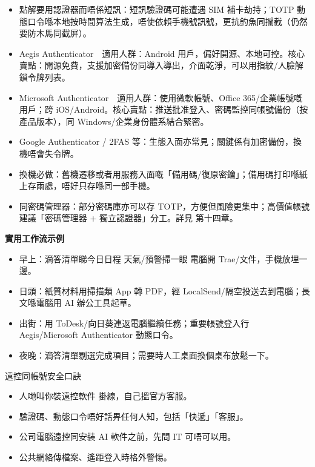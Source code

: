 
\begin{itemize}
  \item 點解要用認證器而唔係短訊：短訊驗證碼可能遭遇 SIM 補卡劫持；TOTP 動態口令喺本地按時間算法生成，唔使依賴手機號訊號，更抗釣魚同攔截（仍然要防木馬同截屏）。
  \item Aegis Authenticator　適用人群：Android 用戶，偏好開源、本地可控。核心賣點：開源免費，支援加密備份同導入導出，介面乾淨，可以用指紋/人臉解鎖令牌列表。
  \item Microsoft Authenticator　適用人群：使用微軟帳號、Office 365/企業帳號嘅用戶；跨 iOS/Android。核心賣點：推送批准登入、密碼監控同帳號備份（按產品版本），同 Windows/企業身份體系結合緊密。
  \item Google Authenticator / 2FAS 等：生態入面亦常見；關鍵係有加密備份，換機唔會失令牌。
  \item 換機必做：舊機遷移或者用服務入面嘅「備用碼/復原密鑰」；備用碼打印喺紙上存兩處，唔好只存喺同一部手機。
  \item 同密碼管理器：部分密碼庫亦可以存 TOTP，方便但風險更集中；高價值帳號建議「密碼管理器 + 獨立認證器」分工。詳見 第十四章。
\end{itemize}


\textbf{實用工作流示例}\par

\begin{itemize}
  \item 早上：滴答清單睇今日日程 天氣/預警掃一眼 電腦開 Trae/文件，手機放埋一邊。
  \item 日頭：紙質材料用掃描類 App 轉 PDF，經 LocalSend/隔空投送去到電腦；長文喺電腦用 AI 辦公工具起草。
  \item 出街：用 ToDesk/向日葵連返電腦繼續任務；重要帳號登入行 Aegis/Microsoft Authenticator 動態口令。
  \item 夜晚：滴答清單剔選完成項目；需要時人工桌面換個桌布放鬆一下。
\end{itemize}

\begin{tcbwarn}{遠控同帳號安全口訣}
\begin{itemize}
  \item 人哋叫你裝遠控軟件 掛線，自己搵官方客服。
  \item 驗證碼、動態口令唔好話畀任何人知，包括「快遞」「客服」。
  \item 公司電腦遠控同安裝 AI 軟件之前，先問 IT 可唔可以用。
  \item 公共網絡傳檔案、遙距登入時格外警惕。
\end{itemize}

\end{tcbwarn}

